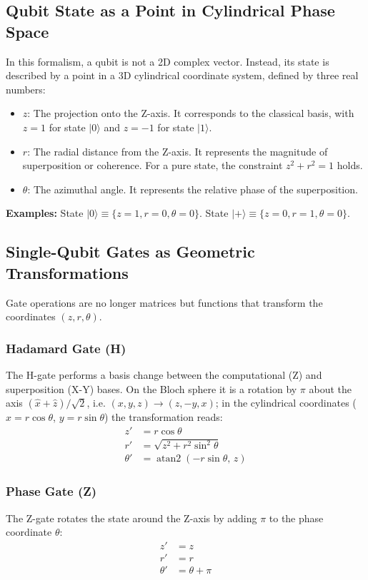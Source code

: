 	\subsection{Qubit State as a Point in Cylindrical Phase Space}
	In this formalism, a qubit is not a 2D complex vector. Instead, its state is described by a point in a 3D cylindrical coordinate system, defined by three real numbers:
	\begin{itemize}
		\item $z$: The projection onto the Z-axis. It corresponds to the classical basis, with $z=1$ for state $|0\rangle$ and $z=-1$ for state $|1\rangle$.
		\item $r$: The radial distance from the Z-axis. It represents the magnitude of superposition or coherence. For a pure state, the constraint $z^2 + r^2 = 1$ holds.
		\item $\theta$: The azimuthal angle. It represents the relative phase of the superposition.
	\end{itemize}
	\textbf{Examples:} State $|0\rangle \equiv \{z=1, r=0, \theta=0\}$. State $|+\rangle \equiv \{z=0, r=1, \theta=0\}$.
	
	\subsection{Single-Qubit Gates as Geometric Transformations}
	Gate operations are no longer matrices but functions that transform the coordinates $(z, r, \theta)$.
	
	\subsubsection{Hadamard Gate (H)}
	The H-gate performs a basis change between the computational (Z) and superposition (X-Y) bases. On the Bloch sphere it is a rotation by $\pi$ about the axis $(\hat{x}+\hat{z})/\sqrt{2}$, i.e. $(x,y,z) \to (z,-y,x)$; in the cylindrical coordinates ($x = r\cos\theta$, $y = r\sin\theta$) the transformation reads:
	\begin{align*}
		z' &= r \cos\theta \\
		r' &= \sqrt{z^2 + r^2 \sin^2\theta} \\
		\theta' &= \operatorname{atan2}(-r \sin\theta,\, z)
	\end{align*}
	
	
	\subsubsection{Phase Gate (Z)}
	The Z-gate rotates the state around the Z-axis by adding $\pi$ to the phase coordinate $\theta$:
	\begin{align*}
		z' &= z \\
		r' &= r \\
		\theta' &= \theta + \pi
	\end{align*}
	
